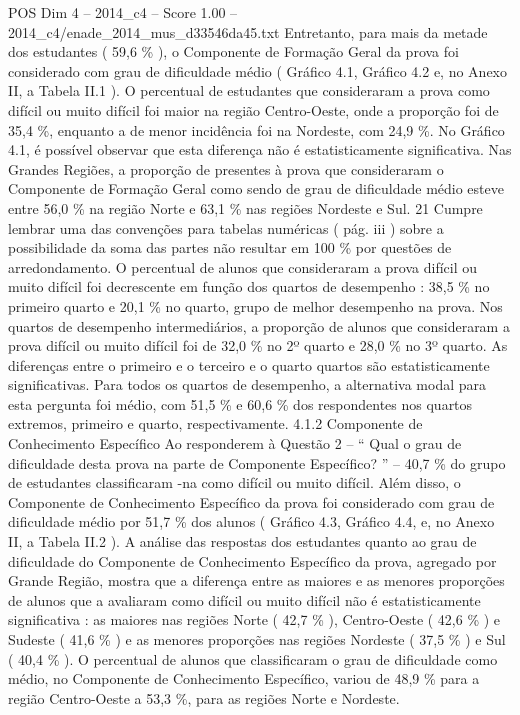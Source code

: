 \begin{textsample}{POS Dim 4 – 2014\_c4 – Score 1.00 – 2014\_c4/enade\_2014\_mus\_d33546da45.txt}
Entretanto, para mais da metade dos estudantes ( 59,6 \% ), o Componente de Formação Geral da prova foi considerado com grau de dificuldade médio ( Gráfico 4.1, Gráfico 4.2 e, no Anexo II, a Tabela II.1 ).
O percentual de estudantes que consideraram a prova como difícil ou muito difícil foi maior na região Centro-Oeste, onde a proporção foi de 35,4 \%, enquanto a de menor incidência foi na Nordeste, com 24,9 \%.
No Gráfico 4.1, é possível observar que esta diferença não é estatisticamente significativa.
Nas Grandes Regiões, a proporção de presentes à prova que consideraram o Componente de Formação Geral como sendo de grau de dificuldade médio esteve entre 56,0 \% na região Norte e 63,1 \% nas regiões Nordeste e Sul. 21 Cumpre lembrar uma das convenções para tabelas numéricas ( pág. iii ) sobre a possibilidade da soma das partes não resultar em 100 \% por questões de arredondamento.
O percentual de alunos que consideraram a prova difícil ou muito difícil foi decrescente em função dos quartos de desempenho : 38,5 \% no primeiro quarto e 20,1 \% no quarto, grupo de melhor desempenho na prova.
Nos quartos de desempenho intermediários, a proporção de alunos que consideraram a prova difícil ou muito difícil foi de 32,0 \% no 2º quarto e 28,0 \% no 3º quarto.
As diferenças entre o primeiro e o terceiro e o quarto quartos são estatisticamente significativas.
Para todos os quartos de desempenho, a alternativa modal para esta pergunta foi médio, com 51,5 \% e 60,6 \% dos respondentes nos quartos extremos, primeiro e quarto, respectivamente. 4.1.2 Componente de Conhecimento Específico Ao responderem à Questão 2 – “ Qual o grau de dificuldade desta prova na parte de Componente Específico? ” – 40,7 \% do grupo de estudantes classificaram -na como difícil ou muito difícil.
Além disso, o Componente de Conhecimento Específico da prova foi considerado com grau de dificuldade médio por 51,7 \% dos alunos ( Gráfico 4.3, Gráfico 4.4, e, no Anexo II, a Tabela II.2 ).
A análise das respostas dos estudantes quanto ao grau de dificuldade do Componente de Conhecimento Específico da prova, agregado por Grande Região, mostra que a diferença entre as maiores e as menores proporções de alunos que a avaliaram como difícil ou muito difícil não é estatisticamente significativa : as maiores nas regiões Norte ( 42,7 \% ), Centro-Oeste ( 42,6 \% ) e Sudeste ( 41,6 \% ) e as menores proporções nas regiões Nordeste ( 37,5 \% ) e Sul ( 40,4 \% ).
O percentual de alunos que classificaram o grau de dificuldade como médio, no Componente de Conhecimento Específico, variou de 48,9 \% para a região Centro-Oeste a 53,3 \%, para as regiões Norte e Nordeste.

\end{textsample}
